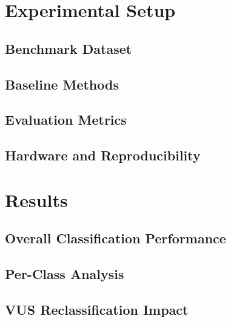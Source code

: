 \documentclass[10pt, conference, compsocconf]{IEEEtran}
\begin{document}
\section{Experimental Setup}
\label{sec:experiments}

\subsection{Benchmark Dataset}

\subsection{Baseline Methods}

\subsection{Evaluation Metrics}

\subsection{Hardware and Reproducibility}

\section{Results}
\label{sec:results}

\subsection{Overall Classification Performance}

\subsection{Per-Class Analysis}

\subsection{VUS Reclassification Impact}
\end{document}
